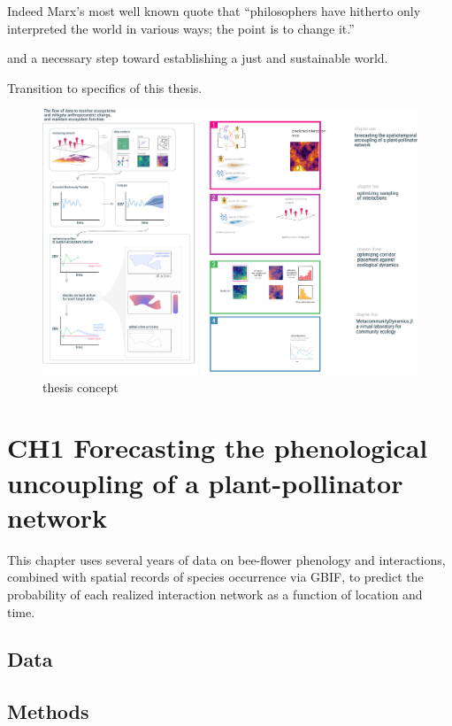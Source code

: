 \documentclass[11pt]{article}
\makeatletter
\def\maxwidth{\ifdim\Gin@nat@width>\linewidth\linewidth
\else\Gin@nat@width\fi}
\let\Oldincludegraphics\includegraphics
\renewcommand{\includegraphics}[1]{\Oldincludegraphics[width=\maxwidth]{#1}}
\makeatother
\begin{document}
Indeed Marx's most well known quote that ``philosophers have hitherto
only interpreted the world in various ways; the point is to change it.''

and a necessary step toward establishing a just and sustainable world.

Transition to specifics of this thesis.

\begin{figure}
\centering
\includegraphics{./figures/thesisconcept.png}
\caption{thesis concept}
\end{figure}

\hypertarget{ch1-forecasting-the-phenological-uncoupling-of-a-plant-pollinator-network}{%
\section{CH1 Forecasting the phenological uncoupling of a
plant-pollinator
network}\label{ch1-forecasting-the-phenological-uncoupling-of-a-plant-pollinator-network}}

This chapter uses several years of data on bee-flower phenology and
interactions, combined with spatial records of species occurrence via
GBIF, to predict the probability of each realized interaction network as
a function of location and time.

\hypertarget{data}{%
\subsection{Data}\label{data}}

\hypertarget{methods}{%
\subsection{Methods}\label{methods}}
\end{document}
